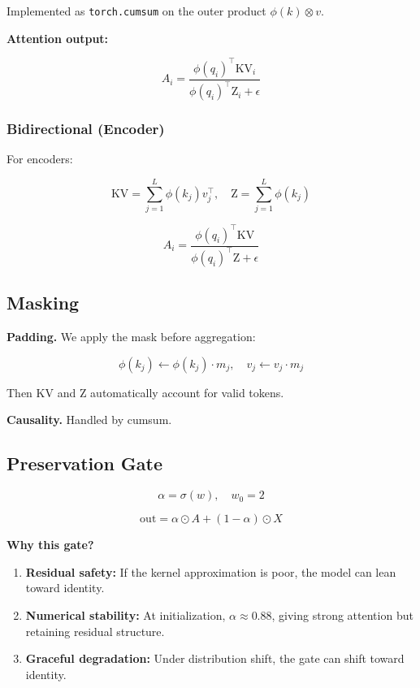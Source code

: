 Implemented as \texttt{torch.cumsum} on the outer product $\phi(k) \otimes v$.

\textbf{Attention output:}

\[
A_i = \frac{\phi(q_i)^\top \text{KV}_i}{\phi(q_i)^\top \text{Z}_i + \epsilon}
\tag{4.9}
\]

\subsubsection{Bidirectional (Encoder)}

For encoders:

\[
\text{KV} = \sum_{j=1}^L \phi(k_j) v_j^\top, \quad
\text{Z} = \sum_{j=1}^L \phi(k_j)
\tag{4.10}
\]

\[
A_i = \frac{\phi(q_i)^\top \text{KV}}{\phi(q_i)^\top \text{Z} + \epsilon}
\tag{4.11}
\]

\subsection{Masking}

\textbf{Padding.} We apply the mask before aggregation:

\[
\phi(k_j) \leftarrow \phi(k_j) \cdot m_j, \quad
v_j \leftarrow v_j \cdot m_j
\tag{4.12}
\]

Then $\text{KV}$ and $\text{Z}$ automatically account for valid tokens.

\textbf{Causality.} Handled by cumsum.

\subsection{Preservation Gate}

\[
\alpha = \sigma(w), \quad w_0 = 2
\tag{4.13}
\]

\[
\text{out} = \alpha \odot A + (1 - \alpha) \odot X
\tag{4.14}
\]

\textbf{Why this gate?}

\begin{enumerate}
\item \textbf{Residual safety:} If the kernel approximation is poor, the model
  can lean toward identity.
\item \textbf{Numerical stability:} At initialization, $\alpha \approx 0.88$,
  giving strong attention but retaining residual structure.
\item \textbf{Graceful degradation:} Under distribution shift, the gate can
  shift toward identity.

\end{enumerate}
